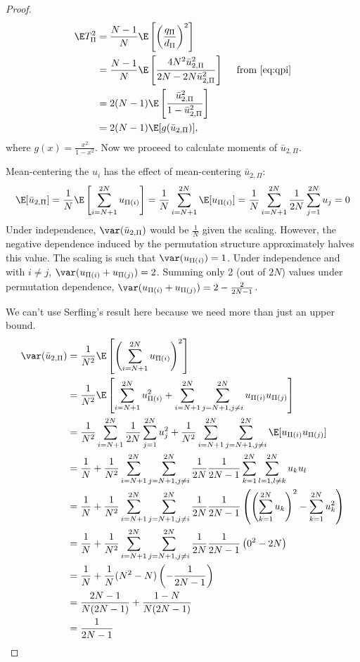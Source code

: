 \begin{proof}
  \begin{align}
    \E T_{\Pi}^2
    &= \frac{N-1}{N} \E \left [ \left ( \frac{q_\Pi}{d_\Pi} \right )^2 \right ] \\
    &= \frac{N-1}{N} \E \left [\frac{
        4 N^2\bar{u}_{2,\Pi}^2}{2N-2N\bar{u}_{2,\Pi}^2} \right ] \quad \text{ from } \eqref{eq:qpi}
    \nonumber \\
    &= 2(N-1)\E \left [\frac{
        \bar{u}_{2,\Pi}^2}{1-\bar{u}_{2,\Pi}^2} \right ] \nonumber \\
    &= 2(N-1) \E[g(\bar{u}_{2,\Pi})], \label{def:varT}
  \end{align}
  where $g(x) = \frac{x^2}{1-x^2}$. Now we proceed to calculate moments of $\bar{u}_{2,\Pi}$.

  Mean-centering the $u_{i}$ has the effect of mean-centering $\bar{u}_{2,\Pi}$:
  \begin{equation*}
    \E[\bar{u}_{2,\Pi}] = 
    \frac{1}{N} \E \left [ \sum_{i=N+1}^{2N} u_{\Pi(i)} \right ] = 
    \frac{1}{N} \sum_{i=N+1}^{2N} \E[u_{\Pi(i)}] = 
    \frac{1}{N} \sum_{i=N+1}^{2N} \frac{1}{2N} \sum_{j=1}^{2N} u_{j} = 0
  \end{equation*}
  Under independence, $\var(\bar{u}_{2,\Pi})$ would be $\frac{1}{N}$ given
  the scaling.  However, the negative dependence induced by the
  permutation structure approximately halves this value.
  The scaling is such that $\var(u_{\Pi(i)}) = 1$.  Under independence and
  with $i \neq j$, $\var(u_{\Pi(i)} + u_{\Pi(j)}) = 2$.  Summing only 2 (out of $2N$)
  values under permutation dependence, $\var(u_{\Pi(i)} + u_{\Pi(j)}) = 2 - \frac{2}{2N-1}$.

  We can't use Serfling's result here because we need more than just an upper bound.
  \begin{align*}
    \var(\bar{u}_{2,\Pi}) 
    &= \frac{1}{N^2} \E \left [\left (\sum_{i=N+1}^{2N}u_{\Pi(i)}\right )^2\right ] \\
    &= \frac{1}{N^2} \E \left [\sum_{i=N+1}^{2N} u_{\Pi(i)}^2 +
    \sum_{i=N+1}^{2N}\sum_{j=N+1, j\neq i}^{2N}u_{\Pi(i)}u_{\Pi(j)} \right ] \\
    &= \frac{1}{N^2} \sum_{i=N+1}^{2N} \frac{1}{2N} \sum_{j=1}^{2N} u_{j}^2
    + \frac{1}{N^2}\sum_{i=N+1}^{2N}\sum_{j=N+1, j\neq
      i}^{2N} \E[u_{\Pi(i)} u_{\Pi(j)}] \\
    &= \frac{1}{N} + \frac{1}{N^2}\sum_{i=N+1}^{2N}\sum_{j=N+1, j\neq
      i}^{2N} \frac{1}{2N}\frac{1}{2N-1}\sum_{k=1}^{2N}
    \sum_{l=1, l\neq k}^{2N} u_ku_l \\
    &= \frac{1}{N} + \frac{1}{N^2}\sum_{i=N+1}^{2N}\sum_{j=N+1, j\neq
      i}^{2N} \frac{1}{2N}\frac{1}{2N-1} \left (
    \left (\sum_{k=1}^{2N} u_k \right )^2 - \sum_{k=1}^{2N} u_k^2
  \right ) \\
    &= \frac{1}{N} + \frac{1}{N^2}\sum_{i=N+1}^{2N}\sum_{j=N+1, j\neq
      i}^{2N} \frac{1}{2N}\frac{1}{2N-1} \left (
    0^2 - 2N \right ) \\
    &= \frac{1}{N} + \frac{1}{N}(N^2-N)\left (-\frac{1}{2N-1}\right ) \\
    &= \frac{2N-1}{N(2N-1)} + \frac{1-N}{N(2N-1)} \\
    &= \frac{1}{2N-1}
  \end{align*}


\end{proof}
